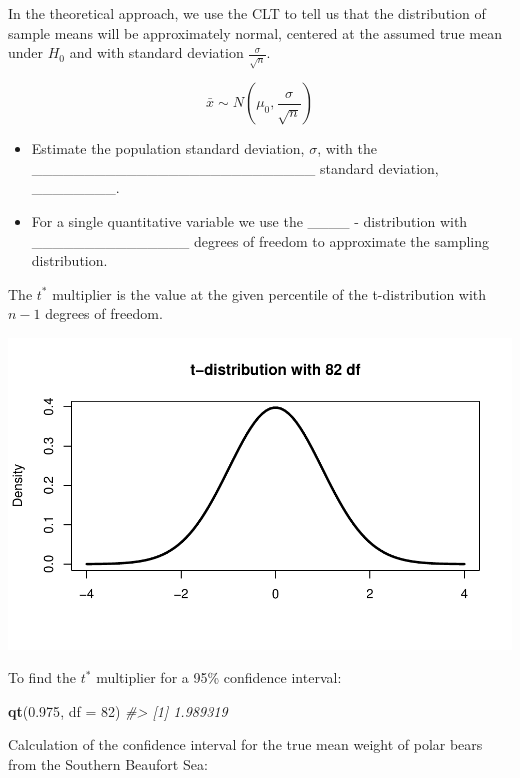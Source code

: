 \documentclass[
]{report}
\newenvironment{Shaded}{\begin{snugshade}}{\end{snugshade}}
\newcommand{\AttributeTok}[1]{\textcolor[rgb]{0.13,0.29,0.53}{#1}}
\newcommand{\CommentTok}[1]{\textcolor[rgb]{0.56,0.35,0.01}{\textit{#1}}}
\newcommand{\DecValTok}[1]{\textcolor[rgb]{0.00,0.00,0.81}{#1}}
\newcommand{\FloatTok}[1]{\textcolor[rgb]{0.00,0.00,0.81}{#1}}
\newcommand{\FunctionTok}[1]{\textcolor[rgb]{0.13,0.29,0.53}{\textbf{#1}}}
\newcommand{\NormalTok}[1]{#1}
\begin{document}
In the theoretical approach, we use the CLT to tell us that the distribution of sample means will be approximately normal, centered at the assumed true mean under \(H_0\) and with standard deviation \(\frac{\sigma}{\sqrt{n}}\).

\[\bar{x} \sim N(\mu_0, \frac{\sigma}{\sqrt{n}})\]

\begin{itemize}
\item
  Estimate the population standard deviation, \(\sigma\), with the
  \_\_\_\_\_\_\_\_\_\_\_\_\_\_\_\_\_\_\_\_\_\_\_\_\_\_\_ standard deviation, \_\_\_\_\_\_\_\_.
\item
  For a single quantitative variable we use the \_\_\_\_ - distribution
  with \_\_\_\_\_\_\_\_\_\_\_\_\_\_\_
  degrees of freedom to approximate the sampling distribution.
\end{itemize}


The \(t^*\) multiplier is the value at the given percentile of the t-distribution with \(n - 1\) degrees of freedom.

\begin{center}\includegraphics[width=0.7\linewidth]{07-VN07-one_meantheory_files/figure-latex/tstarpb-1} \end{center}

\newpage

To find the \(t^*\) multiplier for a 95\% confidence interval:

\begin{Shaded}
\begin{Highlighting}[]
\FunctionTok{qt}\NormalTok{(}\FloatTok{0.975}\NormalTok{, }\AttributeTok{df =} \DecValTok{82}\NormalTok{)}
\CommentTok{\#\textgreater{} [1] 1.989319}
\end{Highlighting}
\end{Shaded}

Calculation of the confidence interval for the true mean weight of polar bears from the Southern Beaufort Sea:
\end{document}
